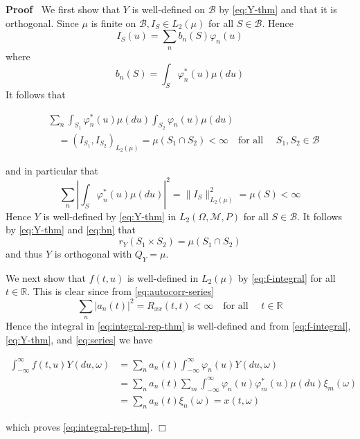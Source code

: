 \documentclass{article}
\newenvironment{proof}{\noindent\textbf{Proof\ }}{\hspace*{\fill}$\Box$\medskip}
\begin{document}
\begin{proof}
  We first show that $Y$ is well-defined on $\mathscr{B}$ by \eqref{eq:Y-thm}
  and that it is orthogonal. Since $\mu$ is finite on $\mathscr{B}, I_S \in
  L_2 (\mu)$ for all $S \in \mathscr{B}$. Hence
  \begin{equation}
    I_S (u) = \sum_n b_n (S) \varphi_n (u) \label{eq:IS}
  \end{equation}
  where
  \begin{equation}
    b_n (S) = \int_S \varphi_n^{\ast} (u) \mu (du) \label{eq:bn}
  \end{equation}
  It follows that
  
  \begin{align}
    & \sum_n \int_{S_1} \varphi_n^{\ast} (u) \mu (du)  \int_{S_2} \varphi_n
    (u) \mu (du) \\
    & \quad = (I_{S_1}, I_{S_2})_{L_2 (\mu)} = \mu (S_1 \cap S_2) < \infty
    \quad \text{for all } \quad S_1, S_2 \in \mathscr{B} 
    \label{eq:sum-finite}
  \end{align}
  
  and in particular that
  \begin{equation}
    \sum_n \left| \int_S \varphi_n^{\ast} (u) \mu (du) \right|^2 = \|I_S
    \|_{L_2 (\mu)}^2 = \mu (S) < \infty \label{eq:mu-finite}
  \end{equation}
  Hence $Y$ is well-defined by \eqref{eq:Y-thm} in $L_2 (\Omega, \mathscr{M},
  P)$ for all $S \in \mathscr{B}$. It follows by \eqref{eq:Y-thm} and
  \eqref{eq:bn} that
  \begin{equation}
    r_Y  (S_1 \times S_2) = \mu (S_1 \cap S_2) \label{eq:rY}
  \end{equation}
  and thus $Y$ is orthogonal with $Q_Y = \mu$.
  
  We next show that $f (t, u)$ is well-defined in $L_2 (\mu)$ by
  \eqref{eq:f-integral} for all $t \in \mathbb{R}$. This is clear since from
  \eqref{eq:autocorr-series}
  \begin{equation}
    \sum_n |a_n (t) |^2 = R_{xx} (t, t) < \infty \quad \text{for all } \quad t
    \in \mathbb{R} \label{eq:an-finite}
  \end{equation}
  Hence the integral in \eqref{eq:integral-rep-thm} is well-defined and from
  \eqref{eq:f-integral}, \eqref{eq:Y-thm}, and \eqref{eq:series} we have
  
  \begin{align}
    \int_{- \infty}^{\infty} f (t, u) Y (du, \omega) & = \sum_n a_n (t) 
    \int_{- \infty}^{\infty} \varphi_n (u) Y (du, \omega) \\
    & = \sum_n a_n (t)  \sum_m \int_{- \infty}^{\infty} \varphi_n (u)
    \varphi_m^{\ast} (u) \mu (du) \xi_m (\omega) \\
    & = \sum_n a_n (t) \xi_n (\omega) = x (t, \omega) 
    \label{eq:integral-proof}
  \end{align}
  
  which proves \eqref{eq:integral-rep-thm}.
\end{proof}
\end{document}
